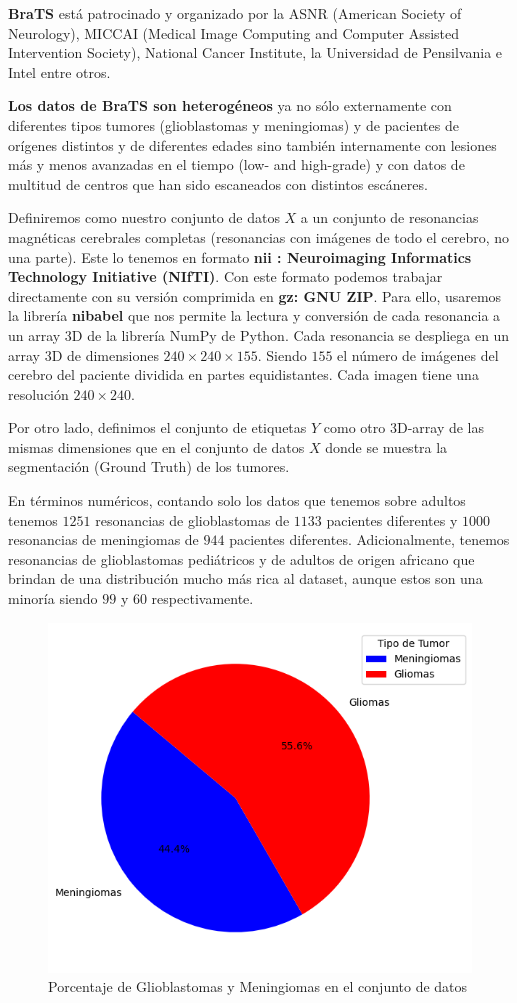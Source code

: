 \textbf{BraTS} está patrocinado y organizado por la ASNR (American Society of Neurology), MICCAI (Medical Image Computing and Computer Assisted Intervention Society), National Cancer Institute, la Universidad de Pensilvania e Intel entre otros. 

\textbf{Los datos de BraTS son heterogéneos} ya no sólo externamente con diferentes tipos tumores (glioblastomas y meningiomas) y de pacientes de orígenes distintos y de diferentes edades sino también internamente con lesiones más y menos avanzadas en el tiempo (low- and high-grade) y con datos de multitud de centros que han sido escaneados con distintos escáneres.

Definiremos como nuestro conjunto de datos \textbf{$X$} a un conjunto de resonancias magnéticas cerebrales completas (resonancias con imágenes de todo el cerebro, no una parte). Este lo tenemos en formato \textbf{nii : Neuroimaging Informatics Technology Initiative (NIfTI)}. Con este formato podemos trabajar directamente con su versión comprimida en \textbf{gz: GNU ZIP}. Para ello, usaremos la librería \textbf{nibabel} que nos permite la lectura y conversión de cada resonancia a un array 3D de la librería NumPy de Python. Cada resonancia se despliega en un array 3D de dimensiones $240 \times 240 \times 155$. Siendo $155$ el número de imágenes del cerebro del paciente dividida en partes equidistantes. Cada imagen tiene una resolución $240 \times 240$.

Por otro lado, definimos el conjunto de etiquetas $Y$ como otro 3D-array de las mismas dimensiones que en el conjunto de datos $X$ donde se muestra la segmentación (Ground Truth) de los tumores.

En términos numéricos, contando solo los datos que tenemos sobre adultos tenemos $1251$ resonancias de glioblastomas de $1133$ pacientes diferentes y $1000$ resonancias de meningiomas de $944$ pacientes diferentes. Adicionalmente, tenemos resonancias de glioblastomas pediátricos y de adultos de origen africano que brindan de una distribución mucho más rica al dataset, aunque estos son una minoría siendo $99$ y $60$ respectivamente. 

\begin{figure}[!h]
	\centering
	\includegraphics[width=0.8\linewidth]{imagenes/porcentajeGLIvsMEN.png}
	\caption{Porcentaje de Glioblastomas y Meningiomas en el conjunto de datos}
\end{figure}


